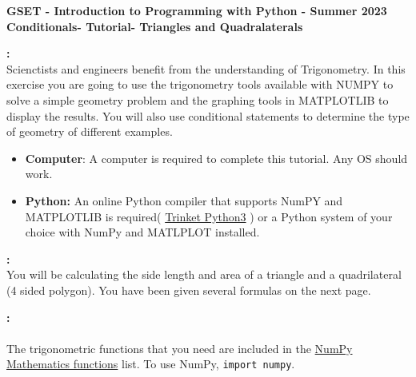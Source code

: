 \documentclass[12pt]{article}
\newcommand{\MNUM}{6} %
\newcommand{\MNAME}{Conditionals} %
\newcommand{\TNAME}{Triangles and Quadralaterals} %
\begin{document}
    \thispagestyle{plain}

    \begin{center}
       {\bf \large GSET - Introduction to Programming with Python - Summer 2023} \vspace{5mm}\\
       {\bf \Large \MNAME \hspc -  Tutorial\hspc\MNUM\hspc - \TNAME}\vspace{3mm}\\      
    \end{center}

	\begin{description}[labelindent=1cm]

        \item [\textbf{\underline{Overview}}]\textbf{:} \\ 
        Scienctists and engineers benefit from the understanding of Trigonometry. In this exercise you are going to use the trigonometry tools available with NUMPY to solve a simple geometry problem and the graphing tools in MATPLOTLIB to display the results. You will also use conditional statements to determine the type of geometry of different examples.

        \item[\textbf{\underline{System Requirements:}}] \hfill \vspace{0mm}
        \begin{itemize}
            \item {\bf Computer}: A computer is required to complete this tutorial. Any OS should work.
            \item {\bf Python:} An online Python compiler that supports NumPY and MATPLOTLIB is required( \href{https://trinket.io/embed/python3/a5bd54189b}{Trinket Python3} ) or a Python system of your choice with NumPy and MATLPLOT installed.
        \end{itemize}

        \item [\textbf{\underline{Simple Geometry - Area of a Polygon}}]\textbf{:} \\
        You will be calculating the side length and area of a triangle and a quadrilateral (4 sided polygon). You have been given several formulas on the next page. \\

        \item [\textbf{\underline{Trigonometric Functions from NumPy}}]\textbf{:}\\\\ The trigonometric functions that you need are included in the \href{https://numpy.org/doc/stable/reference/routines.math.html}{NumPy Mathematics functions} list. To use NumPy, \lstinline{import numpy}.   


\end{description}
\end{document}

